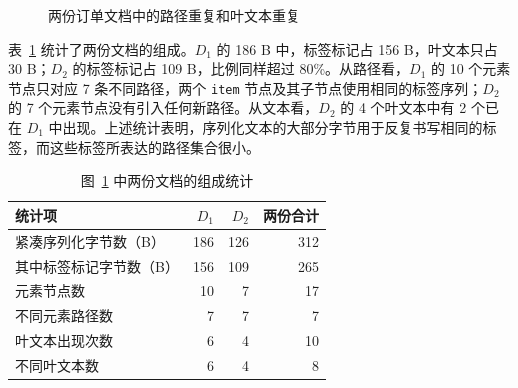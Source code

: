 \begin{figure}[htbp]
\caption{两份订单文档中的路径重复和叶文本重复}
\label{fig:rep-redundancy}
\end{figure}

表~\ref{tab:rep-example-count} 统计了两份文档的组成。$D_1$ 的 186 B 中，标签标记占 156 B，叶文本只占 30 B；$D_2$ 的标签标记占 109 B，比例同样超过 80\%。从路径看，$D_1$ 的 10 个元素节点只对应 7 条不同路径，两个 \texttt{item} 节点及其子节点使用相同的标签序列；$D_2$ 的 7 个元素节点没有引入任何新路径。从文本看，$D_2$ 的 4 个叶文本中有 2 个已在 $D_1$ 中出现。上述统计表明，序列化文本的大部分字节用于反复书写相同的标签，而这些标签所表达的路径集合很小。

\begin{table}[htbp]
\centering\small
\caption{图~\ref{fig:rep-redundancy} 中两份文档的组成统计}
\label{tab:rep-example-count}
\begin{tabular}{lrrr}
\toprule
统计项 & $D_1$ & $D_2$ & 两份合计 \\
\midrule
紧凑序列化字节数（B） & 186 & 126 & 312 \\
其中标签标记字节数（B） & 156 & 109 & 265 \\
元素节点数 & 10 & 7 & 17 \\
不同元素路径数 & 7 & 7 & 7 \\
叶文本出现次数 & 6 & 4 & 10 \\
不同叶文本数 & 6 & 4 & 8 \\
\bottomrule
\end{tabular}
\end{table}

